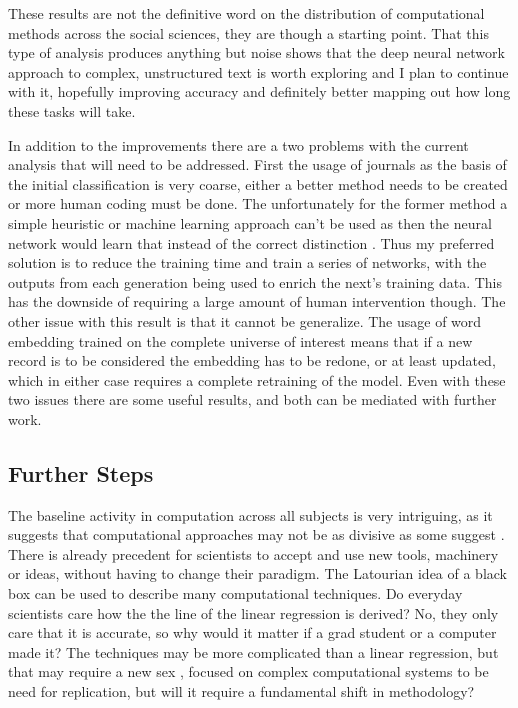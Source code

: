 \documentclass[12pt, a4paper]{article}
\begin{document}
These results are not the definitive word on the distribution of computational methods across the social sciences, they are though a starting point. That this type of analysis produces anything but noise shows that the deep neural network approach to complex, unstructured text is worth exploring and I plan to continue with it, hopefully improving accuracy and definitely better mapping out how long these tasks will take. 

In addition to the improvements there are a two problems with the current analysis that will need to be addressed. First the usage of journals as the basis of the initial classification is very coarse, either a better method needs to be created or more human coding must be done. The unfortunately for the former method a simple heuristic or machine learning approach can't be used as then the neural network would learn that instead of the correct distinction \citep{deep_learning_chapter12}. Thus my preferred solution is to reduce the training time and train a series of networks, with the outputs from each generation being used to enrich the next's training data. This has the downside of requiring  a large amount of human intervention though. The other issue with this result is that it cannot be generalize. The usage of word embedding trained on the complete universe of interest means that if a new record is to be considered the embedding has to be redone, or at least updated, which in either case requires a complete retraining of the model. Even with these two issues there are some useful results, and both can be mediated with further work.

\subsection{Further Steps}

The baseline activity in computation across all subjects is  very intriguing, as it suggests that computational approaches may not be as divisive as some suggest \citep{watts2007twenty}\citep{lazer2009life}. There is already precedent for scientists to accept and use new tools, machinery or ideas, without having to change their paradigm. The Latourian idea of a black box \citep{latour1987science} can be used to describe many computational techniques. Do everyday scientists care how the the line of the linear regression is derived? No, they only care that it is accurate, so why would it matter if a grad student or a computer made it? The techniques may be more complicated than a linear regression, but that may require a new sex \citep{collins1975seven}, focused on complex computational systems to be need for replication, but will it require a fundamental shift in methodology? 
\end{document}
